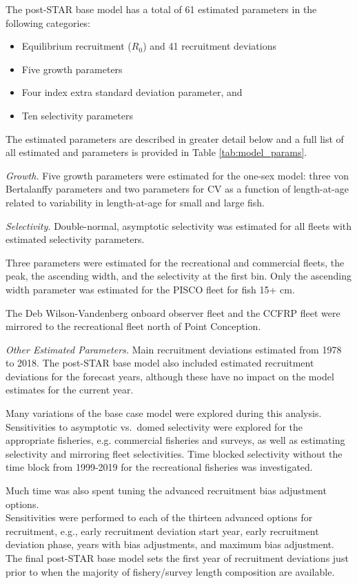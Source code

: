 \documentclass[12pt,]{article}
\begin{document}
The post-STAR base model has a total of 61 estimated parameters in the
following categories:

\begin{itemize}
  \item Equilibrium recruitment ($R_0$) and 41 recruitment deviations
  \item Five growth parameters
  \item Four index extra standard deviation parameter, and
  \item Ten selectivity parameters
\end{itemize}

The estimated parameters are described in greater detail below and a
full list of all estimated and parameters is provided in Table
\ref{tab:model_params}.

\emph{Growth.} Five growth parameters were estimated for the one-sex
model: three von Bertalanffy parameters and two parameters for CV as a
function of length-at-age related to variability in length-at-age for
small and large fish.

\emph{Selectivity.} Double-normal, asymptotic selectivity was estimated
for all fleets with estimated selectivity parameters.

Three parameters were estimated for the recreational and commercial
fleets, the peak, the ascending width, and the selectivity at the first
bin. Only the ascending width parameter was estimated for the PISCO
fleet for fish 15+ cm.

The Deb Wilson-Vandenberg onboard observer fleet and the CCFRP fleet
were mirrored to the recreational fleet north of Point Conception.

\emph{Other Estimated Parameters.} Main recruitment deviations estimated
from 1978 to 2018. The post-STAR base model also included estimated
recruitment deviations for the forecast years, although these have no
impact on the model estimates for the current year.

Many variations of the base case model were explored during this
analysis. Sensitivities to asymptotic vs.~domed selectivity were
explored for the appropriate fisheries, e.g. commercial fisheries and
surveys, as well as estimating selectivity and mirroring fleet
selectivities. Time blocked selectivity without the time block from
1999-2019 for the recreational fisheries was investigated.

Much time was also spent tuning the advanced recruitment bias adjustment
options.\\
Sensitivities were performed to each of the thirteen advanced options
for recruitment, e.g., early recruitment deviation start year, early
recruitment deviation phase, years with bias adjustments, and maximum
bias adjustment. The final post-STAR base model sets the first year of
recruitment deviations just prior to when the majority of fishery/survey
length composition are available.
\end{document}

